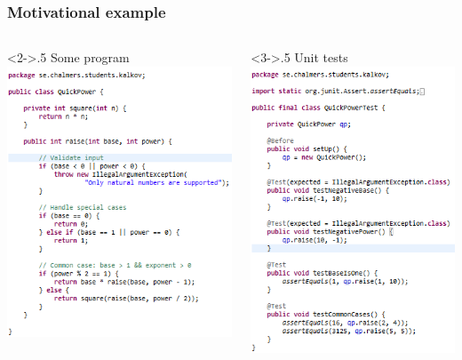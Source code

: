 \documentclass{beamer}
\begin{document}
\begin{frame}
  \frametitle{Motivational example}
\begin{columns}[T]
\begin{column}<2->{.5\textwidth}
  \centering
    Some program\\
    \includegraphics[scale=0.5]{QuickPower.png}
\end{column}
\begin{column}<3->{.5\textwidth}
  \centering
    Unit tests\\
    \includegraphics[scale=0.5]{QuickPowerTest.png}
\end{column}
\end{columns}
\end{frame}
\end{document}
